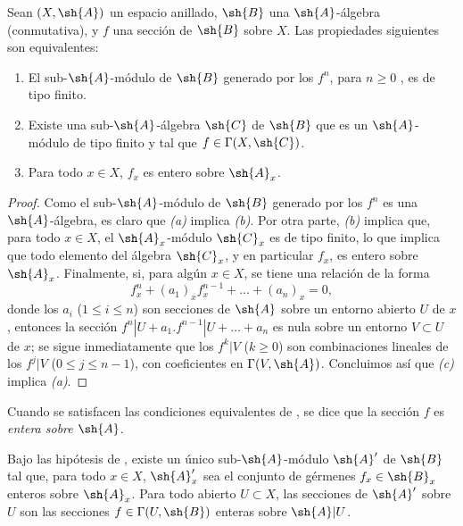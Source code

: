 \documentclass[oneside,10pt]{amsart}
\renewcommand{\leq}{\leqslant}
\renewcommand{\geq}{\geqslant}
\newcommand{\oldpage}[2][]{\marginnote{\normalfont\footnotesize\textbf{#1}~|~#2}\ignorespaces}
\let\EGAOriginalLabel\label
\renewcommand{\label}[1]{\phantomsection\EGAOriginalLabel{#1}}
\begin{document}
\begin{proposition}[6.3.1]
\label{II.6.3.1}
Sean $(X,\sh{A})$ un espacio anillado, $\sh{B}$ una $\sh{A}$-álgebra (conmutativa), y $f$ una sección de $\sh{B}$ sobre $X$.
Las propiedades siguientes son equivalentes:
\begin{enumerate}
  \item[{\rm(a)}] El sub-$\sh{A}$-módulo de $\sh{B}$ generado por los $f^n$, para $n\geq0$ \textup{}, es de tipo finito.
  \item[{\rm(b)}] Existe una sub-$\sh{A}$-álgebra $\sh{C}$ de $\sh{B}$ que es un $\sh{A}$-módulo de tipo finito y tal que $f\in\Gamma(X,\sh{C})$.
  \item[{\rm(c)}] Para todo $x\in X$, $f_x$ es entero sobre $\sh{A}_x$.
\end{enumerate}
\end{proposition}

\oldpage[II]{117}
\begin{proof}
Como el sub-$\sh{A}$-módulo de $\sh{B}$ generado por los $f^n$ es una $\sh{A}$-álgebra, es claro que \emph{(a)} implica \emph{(b)}.
Por otra parte, \emph{(b)} implica que, para todo $x\in X$, el $\sh{A}_x$-módulo $\sh{C}_x$ es de tipo finito, lo que implica que todo elemento del álgebra $\sh{C}_x$, y en particular $f_x$, es entero sobre $\sh{A}_x$.
Finalmente, si, para algún $x\in X$, se tiene una relación de la forma
\[
  f_x^n + (a_1)_xf_x^{n-1} + \ldots + (a_n)_x = 0,
\]
donde los $a_i$ ($1\leq i\leq n$) son secciones de $\sh{A}$ sobre un entorno abierto $U$ de $x$, entonces la sección $f^n|U+a_1.f^{n-1}|U+\ldots+a_n$ es nula sobre un entorno $V\subset U$ de $x$; se sigue inmediatamente que los $f^k|V$ ($k\geq0$) son combinaciones lineales de los $f^j|V$ ($0\leq j\leq n-1$), con coeficientes en $\Gamma(V,\sh{A})$.
Concluimos así que \emph{(c)} implica \emph{(a)}.
\end{proof}

Cuando se satisfacen las condiciones equivalentes de , se dice que la sección $f$ es \emph{entera sobre $\sh{A}$}.

\begin{corollary}[6.3.2]
\label{II.6.3.2}
Bajo las hipótesis de , existe un único sub-$\sh{A}$-módulo $\sh{A}'$ de $\sh{B}$ tal que, para todo $x\in X$, $\sh{A}'_x$ sea el conjunto de gérmenes $f_x\in\sh{B}_x$ enteros sobre $\sh{A}_x$.
Para todo abierto $U\subset X$, las secciones de $\sh{A}'$ sobre $U$ son las secciones $f\in\Gamma(U,\sh{B})$ enteras sobre $\sh{A}|U$.
\end{corollary}
\end{document}
